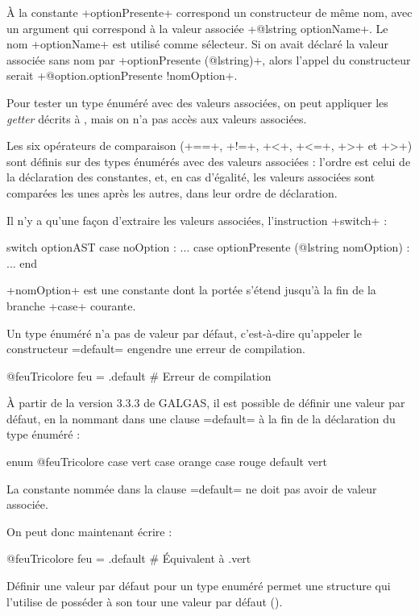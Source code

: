 À la constante \ggst+optionPresente+ correspond un constructeur de même nom, avec un argument qui correspond à la valeur associée \ggst+@lstring optionName+. Le nom \ggst+optionName+ est utilisé comme sélecteur. Si on avait déclaré la valeur associée sans nom par \ggst+optionPresente (@lstring)+, alors l'appel du constructeur serait \ggst+@option.optionPresente {!nomOption}+.

Pour tester un type énuméré avec des valeurs associées, on peut appliquer les \emph{getter} décrits à , mais on n'a pas accès aux valeurs associées.

Les six opérateurs de comparaison (\ggst+==+, \ggst+!=+, \ggst+<+, \ggst+<=+, \ggst+>+ et \ggst+>+) sont définis sur des types énumérés avec des valeurs associées : l'ordre est celui de la déclaration des constantes, et, en cas d'égalité, les valeurs associées sont comparées les unes après les autres, dans leur ordre de déclaration.

Il n'y a qu'une façon d'extraire les valeurs associées, l'instruction \ggst+switch+ :

\begin{galgas3}
switch optionAST
case noOption : ...
case optionPresente (@lstring nomOption) : ...
end
\end{galgas3}

\ggst+nomOption+ est une constante dont la portée s'étend jusqu'à la fin de la branche \ggst+case+ courante.













Un type énuméré n'a pas de valeur par défaut, c'est-à-dire qu'appeler le constructeur \ggst=default= engendre une erreur de compilation.

\begin{galgas3}
@feuTricolore feu = .default # Erreur de compilation
\end{galgas3}

À partir de la version 3.3.3 de GALGAS, il est possible de définir une valeur par défaut, en la nommant dans une clause \ggst=default= à la fin de la déclaration du type énuméré :
\begin{galgas3}
enum @feuTricolore {
  case vert
  case orange
  case rouge
  default vert
}
\end{galgas3}

La constante nommée dans la clause \ggst=default= ne doit pas avoir de valeur associée.

On peut donc maintenant écrire :
\begin{galgas3}
@feuTricolore feu = .default # Équivalent à .vert
\end{galgas3}

Définir une valeur par défaut pour un type enuméré permet une structure qui l'utilise de posséder à son tour une valeur par défaut ().

